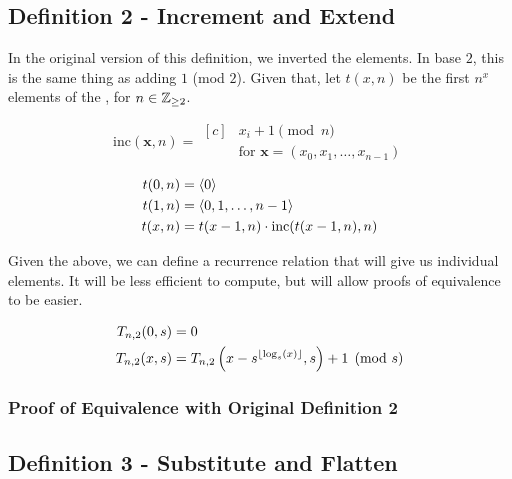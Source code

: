 \documentclass[conference]{IEEEtran}
\begin{document}
\subsection{Definition 2 - Increment and Extend}

In the original version of this definition, we inverted the elements. In base $2$, this is the same thing as adding $1$ (mod $2$). Given that, let $t(x, n)$ be the first $n^x$ elements of the \ETMS, for $n \in \mathbb{Z}_{\ge 2}$.

\begin{equation}
    \text{inc}(\mathbf{x}, n) = \begin{aligned}[c]
            &x_i + 1 \pmod{n} \\
            &\text{for } \mathbf{x} = (x_0, x_1, \ldots, x_{n-1})
    \end{aligned}
\end{equation}

\begin{equation}
    \begin{aligned}
t(0, n) &= \langle 0 \rangle \\
t(1, n) &= \langle 0, 1, \ldots, n - 1 \rangle \\
t(x, n) &= t(x - 1, n) \cdot \text{inc}(t(x - 1, n), n)
    \end{aligned}
\end{equation}

Given the above, we can define a recurrence relation that will give us individual elements. It will be less efficient to compute, but will allow proofs of equivalence to be easier.

\begin{equation}
    \label{eq:pnd02}
    \begin{aligned}
T_{n,2}(0, s) &= 0 \\
T_{n,2}(x, s) &= T_{n,2}\left(x - s^{\floor{\log_s(x)}}, s\right) + 1 \pmod{s}
    \end{aligned}
\end{equation}

\subsubsection{Proof of Equivalence with Original Definition 2}

\subsection{Definition 3 - Substitute and Flatten}
\end{document}
